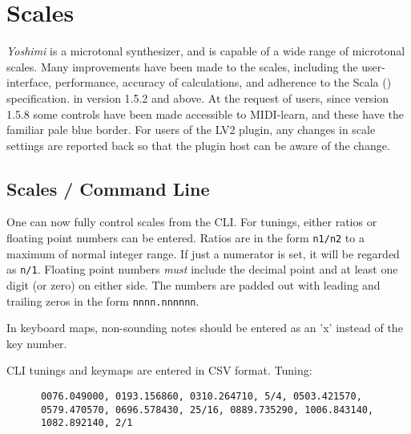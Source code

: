 %
%
%

\section{Scales}
\label{sec:Scales}

   \textsl{Yoshimi} is a microtonal synthesizer, and is capable of a wide
   range of microtonal scales.  Many improvements have been made to the scales,
   including the user-interface, performance, accuracy of calculations,
   and adherence to the Scala (\cite{scala}) specification.
   in version 1.5.2 and above. At the request of users, since version 1.5.8 some controls have been made accessible to MIDI-learn, and these have the familiar pale blue border.
   For users of the LV2 plugin, any changes in scale
   settings are reported back so that the plugin host can be aware of the
   change.

\subsection{Scales / Command Line}
\label{subsec:scales_command_line}

	One can now fully control scales from the CLI.
	For tunings, either ratios or floating point numbers can be entered.
	Ratios are in the form
	\texttt{n1/n2} to a maximum of normal integer range.
   If just a numerator is set, it will be regarded as \texttt{n/1}.
   Floating point numbers \textsl{must}
   include the decimal point and at least one digit (or zero) on either side.
   The numbers are padded out with leading and trailing zeros in the form
   \texttt{nnnn.nnnnnn}.

   In keyboard maps, non-sounding notes should be entered as an 'x' instead of
   the key number.

   CLI tunings and keymaps are entered in CSV format.
   Tuning:

   \begin{verbatim}
      0076.049000, 0193.156860, 0310.264710, 5/4, 0503.421570,
      0579.470570, 0696.578430, 25/16, 0889.735290, 1006.843140,
      1082.892140, 2/1
   \end{verbatim}

